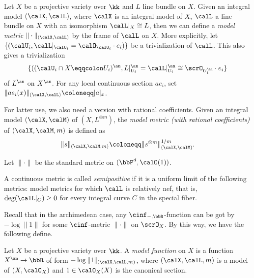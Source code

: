 \begin{construction}[label=\labelNFM{constr:model-metric}, status=draft, tag=0000000]
	Let $X$ be a projective variety over $\kk$ and $L$ line bundle on $X$.
	Given an integral model $(\calX,\calL)$, where $\calX$ is an integral model of $X$, $\calL$ a line bundle on $X$ with an isomorphism $\calL|_X \cong L$,
	then we can define a \emph{model metric} $\|\cdot\|_{(\calX,\calL)}$ by the frame of $\calL$ on $X$.
	More explicitly, let $\{(\calU_i,\calL|_{\calU_i} = \calO_{\calU_i} \cdot e_i) \}$ be a trivialization of $\calL$.
	This also gives a trivialization
	\[ \{((\calU_i \cap X \eqqcolon U_i)^{\an}, L|_{U_i}^{\an} = \calL|_{U_i}^{\an} \cong \scrO_{U_i^\an} \cdot e_i\} \]
	of $L^{\an}$ on $X^\an$.
	For any local continuous section $ae_i$, set $\|ae_i(x)\|_{(\calX,\calL)} \coloneqq |a|_x$.

	For latter use, we also need a version with rational coefficients.
	Given an integral model $(\calX,\calM)$ of $(X,L^{\otimes m})$, the \emph{model metric (with rational coefficients)} of $(\calX,\calM, m)$ is defined as
	\[ \|s\|_{(\calX,\calM,m)} \coloneqq \|s^{\otimes m}\|_{(\calX,\calM)}^{1/m}.\]
\end{construction}

\begin{example}[label=\labelNFM{eg:standard-metric-are-model-metric}, status=draft, tag=0000000]
	Let $\|\cdot\|$ be the standard metric on $(\bbP^d,\calO(1))$.

	\Yang{}
\end{example}

\begin{definition}[label=\labelNFM{def:semipositive-local-metric}, status=draft, tag=0000000]
	A continuous metric is called \emph{semipositive} if it is a uniform limit of the following metrics: model metrics for which $\calL$ is relatively nef, that is, $\deg(\calL|_C) \geq 0$ for every integral curve $C$ in the special fiber.
	\Yang{}
\end{definition}


Recall that in the archimedean case, any $\cinf_{-,\bbR}$-function can be got by $-\log \|1\|$ for some $\cinf$-metric $\|\cdot\|$ on $\scrO_X$.
By this way, we have the following define.

\begin{definition}[label=\labelNFM{def:model-function-over-na-place}, status=draft, tag=0000000]
	Let $X$ be a projective variety over $\kk$.
	A \emph{model function} on $X$ is a function $X^\an \to \bbR$ of form $- \log \|1\|_{(\calX,\calL,m)}$, where $(\calX,\calL,m)$ is a model of $(X,\calO_X)$ and $1 \in \calO_X(X)$ is the canonical section.
\end{definition}

